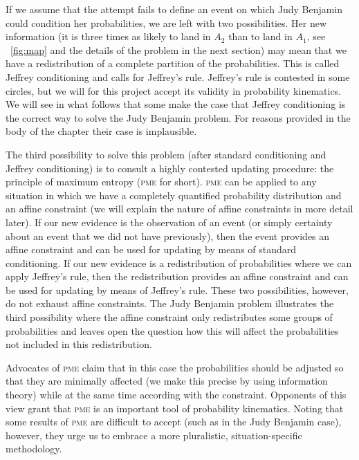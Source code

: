 \documentclass[phd,12pt,oneside]{ubcthesis}
\begin{document}
If we assume that the attempt fails to define an event on which Judy
Benjamin could condition her probabilities, we are left with two
possibilities. Her new information (it is three times as likely to
land in $A_{2}$ than to land in $A_{1}$, see {\igure}~\ref{fig:map} and
the details of the problem in the next section) may mean that we have
a redistribution of a complete partition of the probabilities. This is
called Jeffrey conditioning and calls for Jeffrey's rule. Jeffrey's
rule is contested in some circles, but we will for this project accept
its validity in probability kinematics. We will see in what follows
that some make the case that Jeffrey conditioning is the correct way
to solve the Judy Benjamin problem. For reasons provided in the body
of the chapter their case is implausible.

The third possibility to solve this problem (after standard
conditioning and Jeffrey conditioning) is to consult a highly
contested updating procedure: the principle of maximum entropy
(\textsc{pme} for short). \textsc{pme} can be applied to any
situation in which we have a completely quantified probability
distribution and an affine constraint (we will explain the nature of
affine constraints in more detail later). If our new evidence is the
observation of an event (or simply certainty about an event that we
did not have previously), then the event provides an affine constraint
and can be used for updating by means of standard conditioning. If our
new evidence is a redistribution of probabilities where we can apply
Jeffrey's rule, then the redistribution provides an affine constraint
and can be used for updating by means of Jeffrey's rule. These two
possibilities, however, do not exhaust affine constraints. The Judy
Benjamin problem illustrates the third possibility where the affine
constraint only redistributes some groups of probabilities and leaves
open the question how this will affect the probabilities not included
in this redistribution.

Advocates of \textsc{pme} claim that in this case the probabilities
should be adjusted so that they are minimally affected (we make this
precise by using information theory) while at the same time according
with the constraint. Opponents of this view grant that \textsc{pme}
is an important tool of probability kinematics. Noting that some
results of \textsc{pme} are difficult to accept (such as in the
Judy Benjamin case), however, they urge us to embrace a more
pluralistic, situation-specific methodology.
\end{document}
